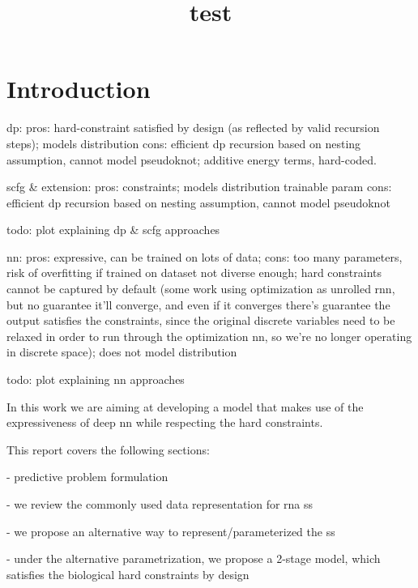 \documentclass{article}
\title{test}
\begin{document}
\maketitle



\section{Introduction}

dp:
pros: hard-constraint satisfied by design (as reflected by valid recursion steps);
models distribution
cons: efficient dp recursion based on nesting assumption, cannot model pseudoknot;
additive energy terms, hard-coded.

scfg & extension:
pros: constraints;
models distribution
trainable param
cons: efficient dp recursion based on nesting assumption, cannot model pseudoknot


todo: plot explaining dp & scfg approaches

nn:
pros: expressive, can be trained on lots of data;
cons: too many parameters, risk of overfitting if trained on dataset not diverse enough;
hard constraints cannot be captured by default
(some work using optimization as unrolled rnn, but no guarantee it'll converge,
and even if it converges there's guarantee the output satisfies the constraints,
since the original discrete variables need to be relaxed in order to run through the optimization nn,
so we're no longer operating in discrete space);
does not model distribution

todo: plot explaining nn approaches


In this work we are aiming at developing a model that makes use of the expressiveness of deep nn
while respecting the hard constraints.

This report covers the following sections:

- predictive problem formulation

- we review the commonly used data representation for rna ss

- we propose an alternative way to represent/parameterized the ss

- under the alternative parametrization, we propose a 2-stage model,
which satisfies the biological hard constraints by design
\end{document}

